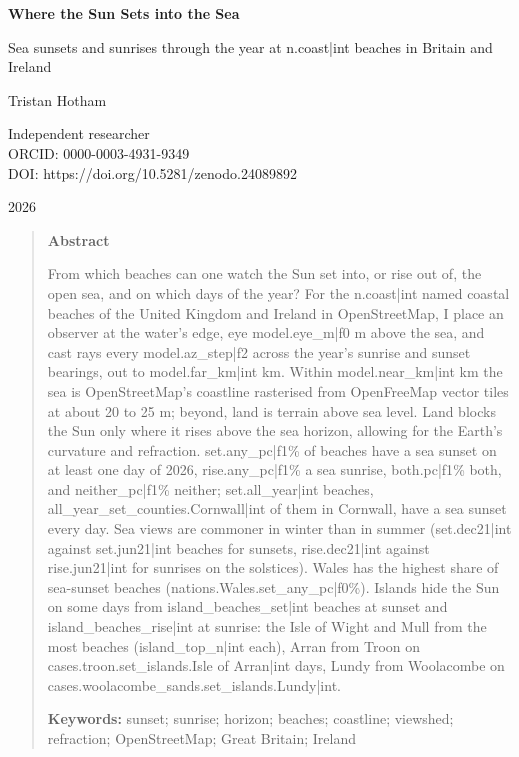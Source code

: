 \documentclass[11pt,a4paper]{article}
\begin{document}
\begin{center}
{\Large\bfseries Where the Sun Sets into the Sea\par}
\vspace{0.4em}
{\large Sea sunsets and sunrises through the year at {{n.coast|int}} beaches in Britain and Ireland\par}
\vspace{1.2em}
{\large Tristan Hotham\par}
\vspace{0.3em}
{\small Independent researcher\\
ORCID: 0000-0003-4931-9349\\
DOI: https://doi.org/10.5281/zenodo.24089892\par}
\vspace{0.8em}
2026
\end{center}

\begin{quote}
\small
\begin{center}\textbf{Abstract}\end{center}
From which beaches can one watch the Sun set into, or rise out of, the open sea, and on which days of the year? For the {{n.coast|int}} named coastal beaches of the United Kingdom and Ireland in OpenStreetMap, I place an observer at the water's edge, eye {{model.eye_m|f0}} m above the sea, and cast rays every {{model.az_step|f2}}\textdegree{} across the year's sunrise and sunset bearings, out to {{model.far_km|int}} km. Within {{model.near_km|int}} km the sea is OpenStreetMap's coastline rasterised from OpenFreeMap vector tiles at about 20 to 25 m; beyond, land is terrain above sea level. Land blocks the Sun only where it rises above the sea horizon, allowing for the Earth's curvature and refraction. {{set.any_pc|f1}}\% of beaches have a sea sunset on at least one day of 2026, {{rise.any_pc|f1}}\% a sea sunrise, {{both.pc|f1}}\% both, and {{neither_pc|f1}}\% neither; {{set.all_year|int}} beaches, {{all_year_set_counties.Cornwall|int}} of them in Cornwall, have a sea sunset every day. Sea views are commoner in winter than in summer ({{set.dec21|int}} against {{set.jun21|int}} beaches for sunsets, {{rise.dec21|int}} against {{rise.jun21|int}} for sunrises on the solstices). Wales has the highest share of sea-sunset beaches ({{nations.Wales.set_any_pc|f0}}\%). Islands hide the Sun on some days from {{island_beaches_set|int}} beaches at sunset and {{island_beaches_rise|int}} at sunrise: the Isle of Wight and Mull from the most beaches ({{island_top_n|int}} each), Arran from Troon on {{cases.troon.set_islands.Isle of Arran|int}} days, Lundy from Woolacombe on {{cases.woolacombe_sands.set_islands.Lundy|int}}.

\textbf{Keywords:} sunset; sunrise; horizon; beaches; coastline; viewshed; refraction; OpenStreetMap; Great Britain; Ireland
\end{quote}
\end{document}

